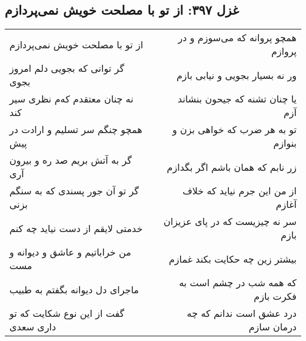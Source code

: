 \begin{center}
\section*{غزل ۳۹۷: از تو با مصلحت خویش نمی‌پردازم}
\label{sec:397}
\begin{longtable}{l p{0.5cm} r}
از تو با مصلحت خویش نمی‌پردازم
&&
همچو پروانه که می‌سوزم و در پروازم
\\
گر توانی که بجویی دلم امروز بجوی
&&
ور نه بسیار بجویی و نیابی بازم
\\
نه چنان معتقدم که‌م نظری سیر کند
&&
یا چنان تشنه که جیحون بنشاند آزم
\\
همچو چنگم سر تسلیم و ارادت در پیش
&&
تو به هر ضرب که خواهی بزن و بنوازم
\\
گر به آتش بریم صد ره و بیرون آری
&&
زر نابم که همان باشم اگر بگدازم
\\
گر تو آن جور پسندی که به سنگم بزنی
&&
از من این جرم نیاید که خلاف آغازم
\\
خدمتی لایقم از دست نیاید چه کنم
&&
سر نه چیزیست که در پای عزیزان بازم
\\
من خراباتیم و عاشق و دیوانه و مست
&&
بیشتر زین چه حکایت بکند غمازم
\\
ماجرای دل دیوانه بگفتم به طبیب
&&
که همه شب در چشم است به فکرت بازم
\\
گفت از این نوع شکایت که تو داری سعدی
&&
درد عشق است ندانم که چه درمان سازم
\\
\end{longtable}
\end{center}
